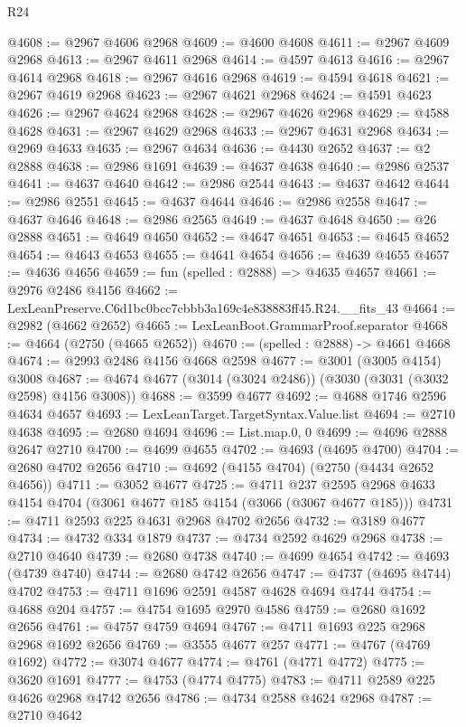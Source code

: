\begin{lexlean}{R24}
\begin{coremodule}
@4608 := @2967 @4606 @2968
@4609 := @4600 @4608
@4611 := @2967 @4609 @2968
@4613 := @2967 @4611 @2968
@4614 := @4597 @4613
@4616 := @2967 @4614 @2968
@4618 := @2967 @4616 @2968
@4619 := @4594 @4618
@4621 := @2967 @4619 @2968
@4623 := @2967 @4621 @2968
@4624 := @4591 @4623
@4626 := @2967 @4624 @2968
@4628 := @2967 @4626 @2968
@4629 := @4588 @4628
@4631 := @2967 @4629 @2968
@4633 := @2967 @4631 @2968
@4634 := @2969 @4633
@4635 := @2967 @4634
@4636 := @4430 @2652
@4637 := @2 @2888
@4638 := @2986 @1691
@4639 := @4637 @4638
@4640 := @2986 @2537
@4641 := @4637 @4640
@4642 := @2986 @2544
@4643 := @4637 @4642
@4644 := @2986 @2551
@4645 := @4637 @4644
@4646 := @2986 @2558
@4647 := @4637 @4646
@4648 := @2986 @2565
@4649 := @4637 @4648
@4650 := @26 @2888
@4651 := @4649 @4650
@4652 := @4647 @4651
@4653 := @4645 @4652
@4654 := @4643 @4653
@4655 := @4641 @4654
@4656 := @4639 @4655
@4657 := @4636 @4656
@4659 := fun (spelled : @2888) => @4635 @4657
@4661 := @2976 @2486 @4156
@4662 := LexLeanPreserve.C6d1bc0bcc7cbbb3a169c4e838883ff45.R24.__fits_43
@4664 := @2982 (@4662 @2652)
@4665 := LexLeanBoot.GrammarProof.separator
@4668 := @4664 (@2750 (@4665 @2652))
@4670 := (spelled : @2888) -> @4661 @4668
@4674 := @2993 @2486 @4156 @4668 @2598
@4677 := @3001 (@3005 @4154) @3008
@4687 := @4674 @4677 (@3014 (@3024 @2486)) (@3030 (@3031 (@3032 @2598) @4156 @3008))
@4688 := @3599 @4677
@4692 := @4688 @1746 @2596 @4634 @4657
@4693 := LexLeanTarget.TargetSyntax.Value.list
@4694 := @2710 @4638
@4695 := @2680 @4694
@4696 := List.map.{0, 0}
@4699 := @4696 @2888 @2647 @2710
@4700 := @4699 @4655
@4702 := @4693 (@4695 @4700)
@4704 := @2680 @4702 @2656
@4710 := @4692 (@4155 @4704) (@2750 (@4434 @2652 @4656))
@4711 := @3052 @4677
@4725 := @4711
    @237
    @2595
    @2968
    @4633
    @4154
    @4704
    (@3061 @4677 @185 @4154 (@3066 (@3067 @4677 @185)))
@4731 := @4711 @2593 @225 @4631 @2968 @4702 @2656
@4732 := @3189 @4677
@4734 := @4732 @334 @1879
@4737 := @4734 @2592 @4629 @2968
@4738 := @2710 @4640
@4739 := @2680 @4738
@4740 := @4699 @4654
@4742 := @4693 (@4739 @4740)
@4744 := @2680 @4742 @2656
@4747 := @4737 (@4695 @4744) @4702
@4753 := @4711 @1696 @2591 @4587 @4628 @4694 @4744
@4754 := @4688 @204
@4757 := @4754 @1695 @2970 @4586
@4759 := @2680 @1692 @2656
@4761 := @4757 @4759 @4694
@4767 := @4711 @1693 @225 @2968 @2968 @1692 @2656
@4769 := @3555 @4677 @257
@4771 := @4767 (@4769 @1692)
@4772 := @3074 @4677
@4774 := @4761 (@4771 @4772)
@4775 := @3620 @1691
@4777 := @4753 (@4774 @4775)
@4783 := @4711 @2589 @225 @4626 @2968 @4742 @2656
@4786 := @4734 @2588 @4624 @2968
@4787 := @2710 @4642

\end{coremodule}
\end{lexlean}
